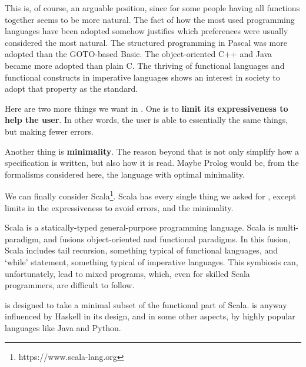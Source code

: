 This is, of course, an arguable position, since for some people having all functions together seems to be more natural.
The fact of how the most used programming languages have been adopted somehow justifies which preferences were usually considered the most natural.
The structured programming in Pascal was more adopted than the GOTO-based Basic.
The object-oriented C++ and Java became more adopted than plain C.
The thriving of functional languages and functional constructs in imperative languages shows an interest in society to adopt that property as the standard.

Here are two more things we want in \Soda.
One is to \textbf{limit its expressiveness to help the user}.
In other words, the user is able to essentially the same things, but making fewer errors.

Another thing is \textbf{minimality}.
The reason beyond that is not only simplify how a specification is written, but also how it is read.
Maybe Prolog would be, from the formalisms considered here, the language with optimal minimality.

We can finally consider Scala\footnote{https://www.scala-lang.org}.
Scala has every single thing we asked for \Soda, except limits in the expressiveness to avoid errors, and the minimality.

Scala is a statically-typed general-purpose programming language.
Scala is multi-paradigm, and fusions object-oriented and functional paradigms.
In this fusion, Scala includes tail recursion, something typical of functional languages, and `while' statement, something typical of imperative languages.
This symbiosis can, unfortunately, lead to mixed programs, which, even for skilled Scala programmers, are difficult to follow.

\Soda is designed to take a minimal subset of the functional part of Scala.
\Soda is anyway influenced by Haskell in its design, and in some other aspects, by highly popular languages like Java and Python.


